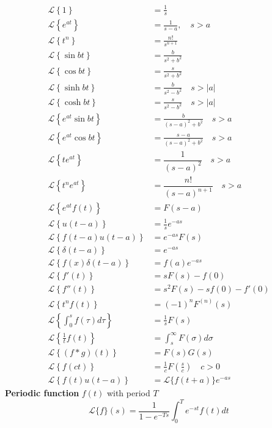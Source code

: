 \documentclass[10pt,leqno]{article}
\begin{document}
\begin{multicols}{2}
\begin{align}
\mathcal{L}\left\{ 1 \right\} & = \frac{1}{s} \label{equ:laplace:1} \\
\mathcal{L}\left\{ e^{at} \right\} & = \frac{1}{s-a}, \quad s>a  \label{equ:laplace:exp} \\
\mathcal{L}\left\{ t^{n} \right\} & = \frac{n!}{s^{n+1}} \\
\mathcal{L}\left\{ \sin bt \right\} &= \frac{b}{s^{2}+b^{2}} \label{equ:laplace:sin} \\
\mathcal{L}\left\{ \cos bt \right\} &= \frac{s}{s^{2}+b^{2}} \label{equ:laplace:cos} \\
\mathcal{L}\left\{ \sinh bt \right\} &= \frac{b}{s^{2}-b^{2}}  \quad s>|a| \\
\mathcal{L}\left\{ \cosh bt \right\} &= \frac{s}{s^{2}-b^{2}}  \quad s>|a| \\
\mathcal{L}\left\{ e^{at}\sin bt \right\} &= \frac{b}{(s-a)^{2}+b^{2}} \quad s>a \label{equ:laplace:expsin} \\
\mathcal{L}\left\{ e^{at}\cos bt \right\} &= \frac{s-a}{(s-a)^{2}+b^{2}} \quad s>a \label{equ:laplace:expcos} \\
\mathcal{L}\left\{ te^{at} \right\} &= \dfrac{1}{(s-a)^{2}} \quad s>a \label{equ:laplace:texp} \\
\mathcal{L}\left\{ t^{n}e^{at} \right\} &= \dfrac{n!}{(s-a)^{n+1}} \quad s>a \\
\mathcal{L}\left\{ e^{at}f(t) \right\} &= F(s-a) \\
\mathcal{L}\left\{ u(t-a) \right\} &= \frac{1}{s}e^{-as} \\
\mathcal{L}\left\{ f(t-a)u(t-a) \right\} &= e^{-as}F(s) \label{equ:laplace:unit} \\
\mathcal{L}\left\{ \delta(t-a) \right\} &= e^{-as} \label{equ:laplace:delta} \\
\mathcal{L}\left\{ f(x)\delta(t-a) \right\} &= f(a)e^{-as} \\
\mathcal{L}\left\{ f'(t) \right\} &= sF(s)-f(0) \\
\mathcal{L}\left\{ f''(t) \right\} &= s^{2}F(s)-sf(0)-f'(0) \\
\mathcal{L}\left\{ t^{n}f(t) \right\} &= (-1)^{n}F^{(n)}(s) \\
\mathcal{L}\left\{ \int_{0}^{s}f(\tau)d\tau \right\} &= \frac{1}{s}F(s) \\
\mathcal{L}\left\{ \frac{1}{t}f(t) \right\} &= \int_{s}^{\infty}F(\sigma)d\sigma \\
\mathcal{L}\left\{ (f*g)(t) \right\} &= F(s)G(s) \label{equ:laplace:convolution} \\
\mathcal{L}\left\{ f(ct) \right\} &= \frac{1}{c}F\left(\frac{s}{c}\right)  \quad c>0 \\
\mathcal{L}\left\{ f(t)u(t-a) \right\} &= \mathcal{L}\{f(t+a)\}e^{-as} 
\end{align}
\textbf{Periodic function} $f(t)$ with period $T$
\begin{equation}
\mathcal{L}\{f\}(s)=\frac{1}{1-e^{-Ts}}\int_{0}^{T}e^{-st}f(t)dt
\end{equation}


\end{multicols}
\end{document}
